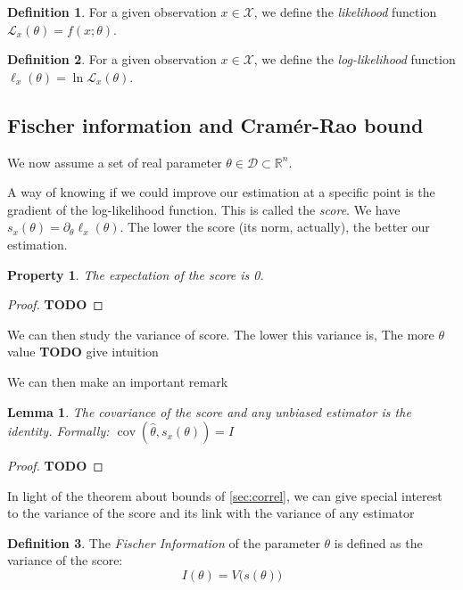 \documentclass[10pt]{report}
\theoremstyle{plain}
\newtheorem{prop}[thm]{Property}
\newtheorem{lem}[thm]{Lemma}
\theoremstyle{definition}
\newtheorem{defn}{Definition}[chapter]
\theoremstyle{remark}
\newcommand{\R}{\ensuremath{\mathbb{R}}}
\newcommand{\TODO}{\textbf{TODO}}
\DeclareMathOperator{\cov}{cov}
\begin{document}
\begin{defn}
  For a given observation $x \in \mathcal{X}$, we define the \emph{likelihood} function
  $\mathcal{L}_x(\theta) = f(x;\theta)$.
\end{defn}

\begin{defn}
  For a given observation $x \in \mathcal{X}$, we define the \emph{log-likelihood} function
  $\ell_x(\theta) = \ln \mathcal{L}_x(\theta)$.
\end{defn}

\subsection{Fischer information and Cramér-Rao bound}

We now assume a set of real parameter $\theta \in \mathcal{D} \subset \R^n$.

A way of knowing if we could improve our estimation at a specific point is the
gradient of the log-likelihood function. This is called the
\emph{score}. We have $s_x(\theta) = \partial_\theta \ell_x(\theta)$. The
lower the score (its norm, actually), the better our estimation.

\begin{prop} The expectation of the score is 0.
\end{prop}
\begin{proof}
  \TODO{}
\end{proof}

We can then study the variance of score. The lower this variance is, The more
$\theta$ value \TODO{} give intuition

We can then make an important remark

\begin{lem}\label{lem:corscr}
  The covariance of the score and any unbiased estimator is the identity.
  Formally: $\cov(\hat \theta, s_x(\theta)) = I$
\end{lem}

\begin{proof}
  \TODO{}
\end{proof}

In light of the theorem about bounds of \cref{sec:correl}, we can give special
interest to the variance of the score and its link with the variance of any estimator

\begin{defn} The \emph{Fischer Information} of the parameter $\theta$ is defined
  as the variance of the score:
  \[I(\theta) = V\big(s(\theta)\big)\]
\end{defn}
\end{document}
